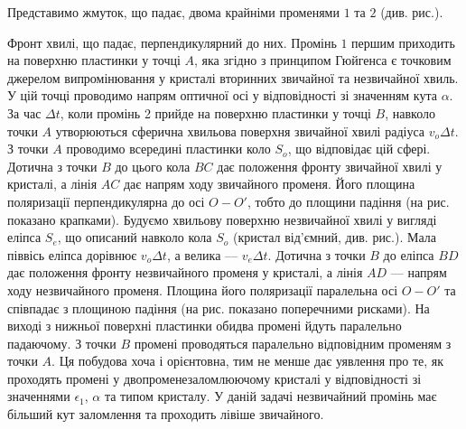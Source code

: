 \begin{solutionexample}

Представимо жмуток, що падає, двома крайніми променями $ 1 $ та $ 2 $ (див. рис.).

\begin{center}
    
\end{center}
Фронт хвилі, що падає, перпендикулярний до них. Промінь $ 1 $ першим приходить на поверхню пластинки у точці $ A $, яка згідно з принципом Гюйгенса є точковим джерелом випромінювання у кристалі вторинних звичайної та незвичайної хвиль. У цій точці проводимо напрям оптичної осі у відповідності зі значенням кута $ \alpha $. За час $ \Delta t $, коли промінь 2 прийде на поверхню пластинки у точці $ B $, навколо точки $ A $ утворюються сферична хвильова поверхня звичайної хвилі радіуса $ v_o\Delta t $. З точки $ A $ проводимо всередині пластинки коло $ S_o $, що відповідає цій сфері. Дотична з точки $ B $ до цього кола $ BC $ дає положення фронту звичайної хвилі у кристалі, а лінія $ AC $ дає напрям ходу звичайного променя. Його площина поляризації перпендикулярна до осі $ O - O' $, тобто до площини падіння (на рис. показано крапками). Будуємо хвильову поверхню незвичайної хвилі у вигляді еліпса $ S_e $, що описаний навколо кола $ S_o $ (кристал від’ємний, див. рис.). Мала піввісь еліпса дорівнює $ v_o\Delta t $, а велика --- $ v_e\Delta t $. Дотична з точки $ B $ до еліпса $ BD $ дає положення фронту незвичайного променя у кристалі, а лінія $ AD $ --- напрям ходу незвичайного променя. Площина його поляризації паралельна осі $ O - O' $ та співпадає з площиною падіння (на рис. показано поперечними рисками). На виході з нижньої поверхні пластинки обидва промені йдуть паралельно падаючому. З точки $ B $ промені проводяться паралельно відповідним променям з точки $ A $. Ця побудова хоча і орієнтовна, тим не менше дає уявлення про те, як проходять промені у двопроменезаломлюючому кристалі у відповідності зі значеннями $ \epsilon_1 $, $ \alpha $ та типом кристалу. У даній задачі незвичайний промінь має більший кут заломлення та проходить лівіше звичайного.
\end{solutionexample}


